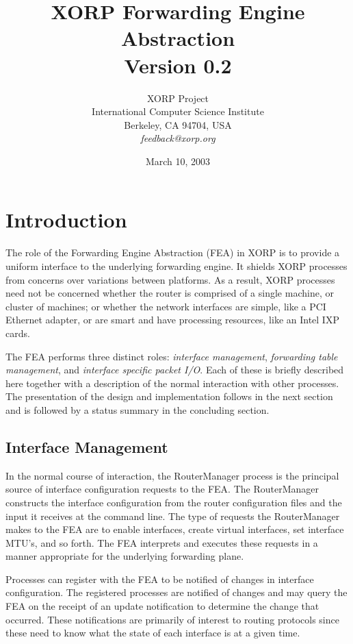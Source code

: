 \documentclass[11pt]{article}
\title{XORP Forwarding Engine Abstraction \\
\vspace{1ex}
Version 0.2}
\author{ XORP Project					\\
	 International Computer Science Institute	\\
	 Berkeley, CA 94704, USA			\\
	 {\it feedback@xorp.org}
}
\date{March 10, 2003}
\begin{document}
\maketitle

\section{Introduction}

The role of the Forwarding Engine Abstraction (FEA) in XORP is to
provide a uniform interface to the underlying forwarding engine.  It
shields XORP processes from concerns over variations between
platforms.  As a result, XORP processes need not be concerned whether
the router is comprised of a single machine, or cluster of machines;
or whether the network interfaces are simple, like a PCI Ethernet
adapter, or are smart and have processing resources, like an Intel IXP
cards.

The FEA performs three distinct roles: \emph{interface management},
\emph{forwarding table management}, and \emph{interface specific
packet I/O}.  Each of these is briefly described here together with a
description of the normal interaction with other processes.  The
presentation of the design and implementation follows in the next
section and is followed by a status summary in the concluding section.

\subsection{Interface Management}

In the normal course of interaction, the RouterManager process is the
principal source of interface configuration requests to the FEA.  The
RouterManager constructs the interface configuration from the router
configuration files and the input it receives at the command line.
The type of requests the RouterManager makes to the FEA are to enable
interfaces, create virtual interfaces, set interface MTU's, and so
forth.  The FEA interprets and executes these requests in a manner
appropriate for the underlying forwarding plane.

Processes can register with the FEA to be notified of changes in
interface configuration.  The registered processes are notified of
changes and may query the FEA on the receipt of an update notification
to determine the change that occurred.  These notifications are
primarily of interest to routing protocols since these need to know
what the state of each interface is at a given time.
\end{document}
